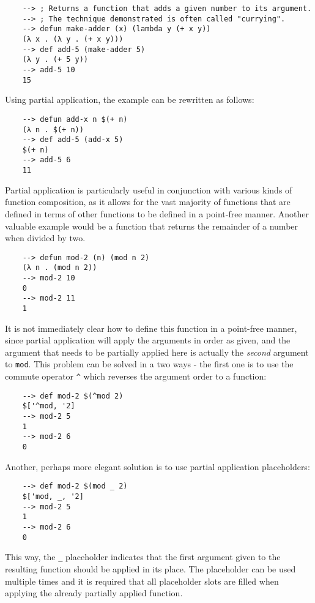 \begin{Verbatim}
    --> ; Returns a function that adds a given number to its argument.
    --> ; The technique demonstrated is often called "currying".
    --> defun make-adder (x) (lambda y (+ x y))
    (λ x . (λ y . (+ x y)))
    --> def add-5 (make-adder 5)
    (λ y . (+ 5 y))
    --> add-5 10
    15
\end{Verbatim}

Using partial application, the example can be rewritten as follows:

\begin{Verbatim}
    --> defun add-x n $(+ n)
    (λ n . $(+ n))
    --> def add-5 (add-x 5)
    $(+ n)
    --> add-5 6
    11
\end{Verbatim}

Partial application is particularly useful in conjunction with various kinds of function composition, as it allows for the vast majority of functions that are defined in terms of other functions to be defined in a point-free manner. Another valuable example would be a function that returns the remainder of a number when divided by two.

\begin{Verbatim}
    --> defun mod-2 (n) (mod n 2)
    (λ n . (mod n 2))
    --> mod-2 10
    0
    --> mod-2 11
    1
\end{Verbatim}

It is not immediately clear how to define this function in a point-free manner, since partial application will apply the arguments in order as given, and the argument that needs to be partially applied here is actually the \textit{second} argument to \verb|mod|. This problem can be solved in a two ways - the first one is to use the commute operator \verb|^| which reverses the argument order to a function:

\begin{Verbatim}
    --> def mod-2 $(^mod 2)
    $['^mod, '2]
    --> mod-2 5
    1
    --> mod-2 6
    0
\end{Verbatim}

Another, perhaps more elegant solution is to use partial application placeholders:

\begin{Verbatim}
    --> def mod-2 $(mod _ 2)
    $['mod, _, '2]
    --> mod-2 5
    1
    --> mod-2 6
    0
\end{Verbatim}

This way, the \verb|_| placeholder indicates that the first argument given to the resulting function should be applied in its place. The placeholder can be used multiple times and it is required that all placeholder slots are filled when applying the already partially applied function.

